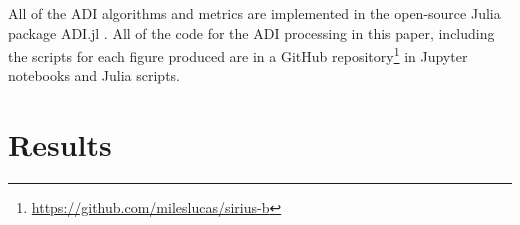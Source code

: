 \documentclass[twocolumn]{aastex631}
\begin{document}
All of the ADI algorithms and metrics are implemented in the open-source Julia package ADI.jl \citep{lucas_adijl_2020}. All of the code for the ADI processing in this paper, including the scripts for each figure produced are in a GitHub repository\footnote{\href{https://github.com/mileslucas/sirius-b}{https://github.com/mileslucas/sirius-b}} in Jupyter notebooks and Julia scripts.

\section{Results} \label{sec:results}

\begin{figure*}
    \centering
    \caption{The flat residuals of each epoch after PSF subtraction, derotating, and collapsing. The inner full-width at half-maximum (FWHM) is masked out for each frame.}
    \label{fig:residuals}
\end{figure*}

\begin{figure*}
    \centering
    \caption{The \textit{significance} maps for each epoch accounting for small sample statistics \citep{mawet_fundamental_2014}. Typically a critical value for detection is 5. The inner full-width at half-maximum (FWHM) is masked out for each map.}
    \label{fig:sig}
\end{figure*}

\begin{figure*}
    \centering
    \caption{The STIM maps for each epoch calculated from the residual cube. The STIM probability has a typical cutoff threshold of 0.5 for significant detections. The inner full-width at half-maximum (FWHM) is masked out for each map.}
    \label{fig:stim}
\end{figure*}

\begin{figure*}[t]
    \centering
    \caption{The contrast curves for the best performing algorithm from each epoch. The solid lines are the Gaussian 5$\sigma$ contrast curves and the dashed lines are the Student-t corrected curves. In addition, the expected upper limit for orbital separation of a stable orbit of \qty{1.5}{\au} is plotted as a vertical dashed line. The companion mass values are interpolated from the AMES-Cond grid. The lower mass limit (upper magnitude limit) of these models is plotted in a light-gray horizontal dashed line.}
    \label{fig:contrast}
\end{figure*}
\end{document}
